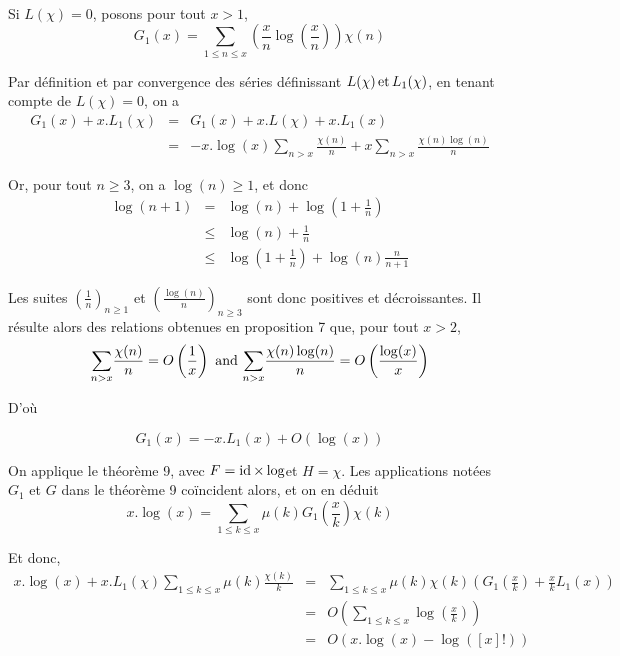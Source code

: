 \

Si $L (\chi) = 0$, posons pour tout $x > 1$,
\[ G_1 (x) = \underset{1 \leqslant n \leqslant x}{\sum} \left( \frac{x}{n}
   \log \left( \frac{x}{n} \right) \right) \chi (n) \]


Par d{\'e}finition et par convergence des s{\'e}ries d{\'e}finissant $L (\chi)
\operatorname{et} L_1 (\chi)$, en tenant compte de $L (\chi) = 0$, on a
\begin{eqnarray*}
  G_1 (x) + x.L_1 (\chi) & = & G_1 (x) + x.L (\chi) + x.L_1 (x)\\
  & = & - x. \log (x) \underset{n > x}{\sum} \frac{\chi (n)}{n} + x
  \underset{n > x}{\sum} \frac{\chi (n) \log (n)}{n}
\end{eqnarray*}


Or, pour tout $n \geqslant 3$, on a $\log (n) \geqslant 1$, et donc
\begin{eqnarray*}
  \log (n + 1) & = & \log (n) + \log \left( 1 + \frac{1}{n} \right)\\
  & \leqslant & \log (n) + \frac{1}{n}\\
  & \leqslant & \log \left( 1 + \frac{1}{n} \right) + \log (n) \frac{n}{n +
  1}
\end{eqnarray*}


Les suites $\left( \frac{1}{n} \right)_{n \geqslant 1}$ et $\left( \frac{\log
(n)}{n} \right)_{n \geqslant 3}$ sont donc positives et d{\'e}croissantes. Il
r{\'e}sulte alors des relations obtenues en proposition 7 que, pour tout $x >
2$,
\[ \underset{n > x}{\sum} \frac{\chi (n)}{n} = O \left( \frac{1}{x} \right)
   \text{ and } \underset{n > x}{\sum} \frac{\chi (n) \log (n)}{n} = O \left(
   \frac{\log (x)}{x} \right) \]


D'o{\`u}


\[ G_1 (x) = - x.L_1 (x) + O (\log (x)) \]


On applique le th{\'e}or{\`e}me 9, avec $F = \operatorname{id} \times \log$et $H =
\chi$. Les applications not{\'e}es $G_1 $ et $G$ dans le th{\'e}or{\`e}me 9
co{\"i}ncident alors, et on en d{\'e}duit
\[ x. \log (x) = \underset{1 \leqslant k \leqslant x}{\sum} \mu (k) G_1 \left(
   \frac{x}{k} \right) \chi (k) \]


Et donc,
\begin{eqnarray*}
  x. \log (x) + x.L_1 (\chi) \underset{1 \leqslant k \leqslant x}{\sum} \mu
  (k) \frac{\chi (k)}{k} & = & \underset{1 \leqslant k \leqslant x}{\sum} \mu
  (k) \chi (k) \left( G_1 \left( \frac{x}{k} \right) + \frac{x}{k} L_1 (x)
  \right)\\
  & = & O \left( \underset{1 \leqslant k \leqslant x}{\sum} \log \left(
  \frac{x}{k} \right) \right)\\
  & = & O (x. \log (x) - \log ([x] !))
\end{eqnarray*}


